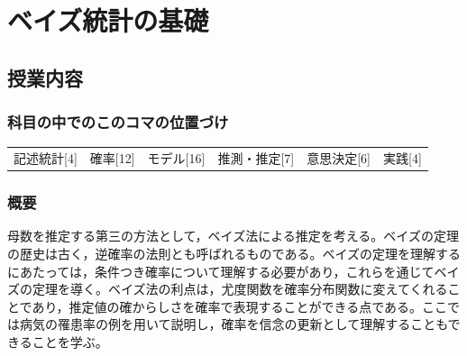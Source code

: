 \section{ベイズ統計の基礎}
\label{D1_lesson25}
\subsection{授業内容}
\subsubsection{科目の中でのこのコマの位置づけ}
\begin{tabular}[t]{cccccc}
    記述統計[4] & 確率[12] & モデル[16] & 推測・推定[7] & 意思決定[6] & 実践[4]
\end{tabular}
\subsubsection{概要}
母数を推定する第三の方法として，ベイズ法による推定を考える。ベイズの定理の歴史は古く，逆確率の法則とも呼ばれるものである。ベイズの定理を理解するにあたっては，条件つき確率について理解する必要があり，これらを通じてベイズの定理を導く。ベイズ法の利点は，尤度関数を確率分布関数に変えてくれることであり，推定値の確からしさを確率で表現することができる点である。ここでは病気の罹患率の例を用いて説明し，確率を信念の更新として理解することもできることを学ぶ。
